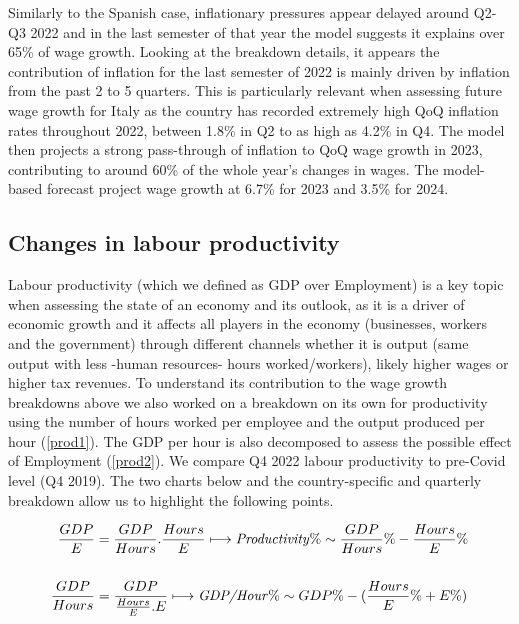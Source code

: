 Similarly to the Spanish case, inflationary pressures appear delayed around Q2-Q3 2022 and in the last semester of that year the model suggests it explains over 65\% of wage growth. 
Looking at the breakdown details, it appears the contribution of inflation for the last semester of 2022 is mainly driven by inflation from the past 2 to 5 quarters. 
This is particularly relevant when assessing future wage growth for Italy as the country has recorded extremely high QoQ inflation rates throughout 2022, between 1.8\% in Q2 to as high as 4.2\% in Q4. 
The model then projects a strong pass-through of inflation to QoQ wage growth in 2023, contributing to around 60\% of the whole year's changes in wages. 
The model-based forecast project wage growth at 6.7\% for 2023 and 3.5\% for 2024.

\subsection{Changes in labour productivity}

\quad Labour productivity (which we defined as GDP over Employment) is a key topic when assessing the state of an economy and its outlook, as it is a driver of economic growth and it affects all players in the economy (businesses, workers and the government) through different channels whether it is output (same output with less -human resources- hours worked/workers), likely higher wages or higher tax revenues. 
To understand its contribution to the wage growth breakdowns above we also worked on a breakdown on its own for productivity using the number of hours worked per employee and the output produced per hour (\ref{prod1}). 
The GDP per hour is also decomposed to assess the possible effect of Employment (\ref{prod2}). We compare Q4 2022 labour productivity to pre-Covid level (Q4 2019). 
The two charts below and the country-specific and quarterly breakdown allow us to highlight the following points.

\begin{align}
    \frac{GDP}{E} &= \frac{GDP}{Hours}.\frac{Hours}{E} \longmapsto \textrm{\textit{Productivity}}\% \sim \frac{GDP}{Hours}\% - \frac{Hours}{E}\% \label{prod1}\\
    \nonumber \\
    \frac{GDP}{Hours} &= \frac{GDP}{\frac{Hours}{E}.E} \longmapsto \textrm{\textit{GDP/Hour}}\% \sim GDP\% - ( \frac{Hours}{E}\% + E\%) \label{prod2}
\end{align}

